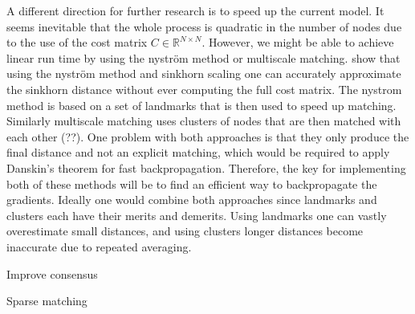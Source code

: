 A different direction for further research is to speed up the current model. It seems inevitable that the whole process is quadratic in the number of nodes due to the use of the cost matrix $C \in \mathbb{R}^{N \times N}$. However, we might be able to achieve linear run time by using the nystr{\"{o}}m method or multiscale matching. \cite{nytrom2019} show that using the nystr{\"{o}}m method and sinkhorn scaling one can accurately approximate the sinkhorn distance without ever computing the full cost matrix. The nystrom method is based on a set of landmarks that is then used to speed up matching. Similarly multiscale matching uses clusters of nodes that are then matched with each other (\citealp{}??). One problem with both approaches is that they only produce the final distance and not an explicit matching, which would be required to apply Danskin's theorem for fast backpropagation. Therefore, the key for implementing both of these methods will be to find an efficient way to backpropagate the gradients. Ideally one would combine both approaches since landmarks and clusters each have their merits and demerits. Using landmarks one can vastly overestimate small distances, and using clusters longer distances become inaccurate due to repeated averaging.


Improve consensus


Sparse matching
